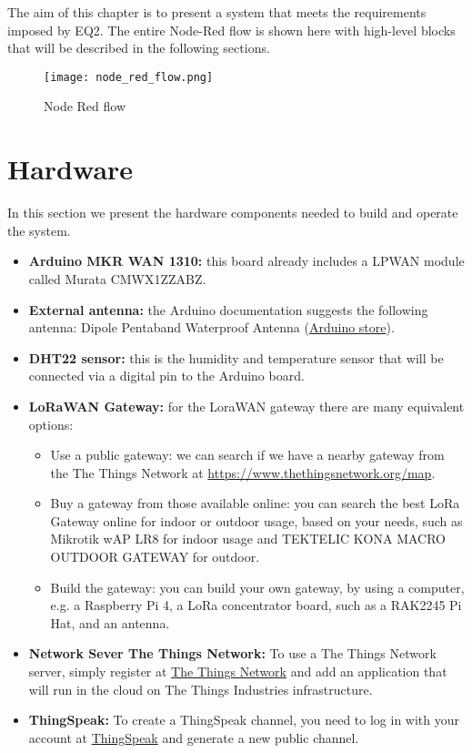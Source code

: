 The aim of this chapter is to present a system that meets the requirements imposed by EQ2.
The entire Node-Red flow is shown here with high-level blocks that will be described in the following sections.
\begin{figure}[H]
    \centering
    \texttt{[image: node\_red\_flow.png]}
    \caption{Node Red flow}
\end{figure}

\section{Hardware}
In this section we present the hardware components needed to build and operate the system. 
\begin{itemize}
\item \textbf{Arduino MKR WAN 1310:} this board already includes a LPWAN module called Murata CMWX1ZZABZ.
\item \textbf{External antenna:} the Arduino documentation suggests the following antenna: Dipole Pentaband Waterproof Antenna ({\color{blue}\href{https://store.arduino.cc/products/dipole-pentaband-waterproof-antenna}{Arduino store}}).
\item \textbf{DHT22 sensor:} this is the humidity and temperature sensor that will be connected via a digital pin to the Arduino board.
\item \textbf{LoRaWAN Gateway:} for the LoraWAN gateway there are many equivalent options:
\begin{itemize}
\item Use a public gateway: we can search if we have a nearby gateway from the The Things Network at {\color{blue}\url{https://www.thethingsnetwork.org/map}}.
\item Buy a gateway from those available online: you can search the best LoRa Gateway online for indoor or outdoor usage, based on your needs, such as Mikrotik wAP
LR8 for indoor usage and TEKTELIC KONA MACRO OUTDOOR GATEWAY for outdoor.
\item Build the gateway: you can build your own gateway, by using a computer, e.g. a Raspberry Pi 4, a LoRa concentrator board, such as a RAK2245 Pi Hat, and an antenna.
\end{itemize}
\item \textbf{Network Sever The Things Network:} To use a The Things Network server, simply register at {\color{blue}\href{https://console.cloud.thethings.network/}{The Things Network}} and add an application that will run in the cloud on The Things Industries infrastructure.
\item \textbf{ThingSpeak:} To create a ThingSpeak channel, you need to log in with your account at {\color{blue}\href{https://thingspeak.mathworks.com/}{ThingSpeak}} and generate a new public channel.
\end{itemize}
